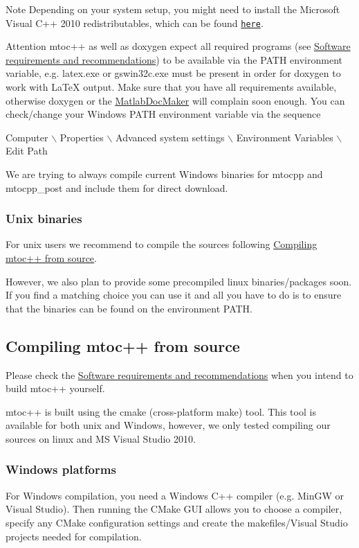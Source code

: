 \begin{DoxyNote}{Note}
Depending on your system setup, you might need to install the Microsoft Visual C++ 2010 redistributables, which can be found \href{http://www.microsoft.com/download/en/confirmation.aspx?id=8328}{\tt here}.
\end{DoxyNote}
\begin{DoxyAttention}{Attention}
mtoc++ as well as doxygen expect all required programs (see \hyperlink{install_inst_req}{Software requirements and recommendations}) to be available via the P\+A\+T\+H environment variable, e.\+g. {\ttfamily latex.\+exe} or {\ttfamily gswin32c.\+exe} must be present in order for doxygen to work with La\+Te\+X output. Make sure that you have all requirements available, otherwise doxygen or the \hyperlink{class_matlab_doc_maker}{Matlab\+Doc\+Maker} will complain soon enough. You can check/change your Windows P\+A\+T\+H environment variable via the sequence 
\begin{DoxyCode}
Computer \(\backslash\) Properties \(\backslash\) Advanced system settings \(\backslash\) Environment Variables \(\backslash\) Edit Path 
\end{DoxyCode}

\end{DoxyAttention}
We are trying to always compile current Windows binaries for {\ttfamily mtocpp} and {\ttfamily mtocpp\+\_\+post} and include them for direct download.\hypertarget{install_inst_binaries_unix}{}\subsubsection{Unix binaries}\label{install_inst_binaries_unix}
For unix users we recommend to compile the sources following \hyperlink{install_inst_comp}{Compiling mtoc++ from source}.

However, we also plan to provide some precompiled linux binaries/packages soon. If you find a matching choice you can use it and all you have to do is to ensure that the binaries can be found on the environment P\+A\+T\+H.\hypertarget{install_inst_comp}{}\subsection{Compiling mtoc++ from source}\label{install_inst_comp}
Please check the \hyperlink{install_inst_req}{Software requirements and recommendations} when you intend to build mtoc++ yourself.

mtoc++ is built using the cmake (cross-\/platform make) tool. This tool is available for both unix and Windows, however, we only tested compiling our sources on linux and M\+S Visual Studio 2010.\hypertarget{install_inst_comp_win}{}\subsubsection{Windows platforms}\label{install_inst_comp_win}
For Windows compilation, you need a Windows C++ compiler (e.\+g. Min\+G\+W or Visual Studio). Then running the C\+Make G\+U\+I allows you to choose a compiler, specify any C\+Make configuration settings and create the makefiles/\+Visual Studio projects needed for compilation.

